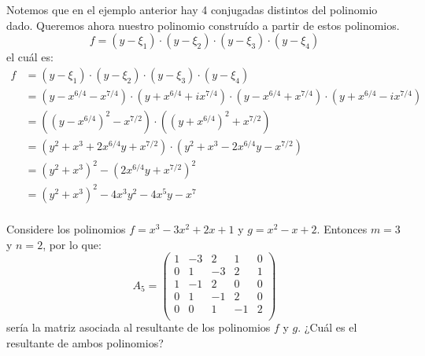 \documentclass[12pt]{report}
\newcounter{it}
\theoremstyle{largebreak}
\begin{document}
    Notemos que en el ejemplo anterior hay 4 conjugadas distintos del polinomio dado. Queremos ahora nuestro polinomio construído a partir de estos polinomios.
    \begin{equation*}
        f=(y-\xi_1)\cdot(y-\xi_2)\cdot(y-\xi_3)\cdot(y-\xi_4)
    \end{equation*}
    el cuál es:
    \begin{equation*}
        \begin{split}
            f&=(y-\xi_1)\cdot(y-\xi_2)\cdot(y-\xi_3)\cdot(y-\xi_4)\\
            &=(y-x^{6/4}-x^{7/4})\cdot(y+x^{6/4}+ix^{7/4})\cdot(y-x^{6/4}+x^{7/4})\cdot(y+x^{6/4}-ix^{7/4})\\
            &=\left((y-x^{ 6/4})^2-x^{7/2} \right)\cdot\left((y+x^{ 6/4})^2+x^{7/2}\right)\\
            &=\left(y^2+x^3+2x^{ 6/4}y+x^{ 7/2}\right)\cdot\left(y^2+x^3-2x^{ 6/4}y-x^{ 7/2}\right)\\
            &=(y^2+x^3)^2-(2x^{6/4}y+x^{7/2})^2\\
            &=(y^2+x^3)^2-4x^3y^2-4x^{5}y-x^7\\
        \end{split}
    \end{equation*}
    
    \begin{exa}
        Considere los polinomios $f=x^3-3x^2+2x+1$ y $g=x^2-x+2$. Entonces $m=3$ y $n=2$, por lo que:
        \begin{equation*}
            A_{5}=\left(
                \begin{array}{ccccc}
                    1 & -3 & 2 & 1 & 0 \\
                    0 & 1 & -3 & 2 & 1 \\
                    1 & -1 & 2 & 0 & 0 \\
                    0 & 1 & -1 & 2 & 0 \\
                    0 & 0 & 1 & -1 & 2 \\
                \end{array}
            \right)
        \end{equation*}
        sería la matriz asociada al resultante de los polinomios $f$ y $g$. ¿Cuál es el resultante de ambos polinomios?
    \end{exa}
\end{document}
